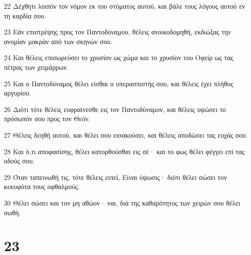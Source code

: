 \par 22 Δέχθητι λοιπόν τον νόμον εκ του στόματος αυτού, και βάλε τους λόγους αυτού εν τη καρδία σου.
\par 23 Εάν επιστρέψης προς τον Παντοδύναμου, θέλεις ανοικοδομηθή, εκδιώξας την ανομίαν μακράν από των σκηνών σου.
\par 24 Και θέλεις επισωρεύσει το χρυσίον ως χώμα και το χρυσίον του Οφείρ ως τας πέτρας των χειμάρρων.
\par 25 Και ο Παντοδύναμος θέλει είσθαι ο υπερασπιστής σου, και θέλεις έχει πλήθος αργυρίου.
\par 26 Διότι τότε θέλεις ευφραίνεσθε εις τον Παντοδύναμον, και θέλεις υψώσει το πρόσωπόν σου προς τον Θεόν.
\par 27 Θέλεις δεηθή αυτού, και θέλει σου εισακούσει, και θέλεις αποδώσει τας ευχάς σου.
\par 28 Και ό,τι αποφασίσης, θέλει κατορθούσθαι εις σέ· και το φως θέλει φέγγει επί τας οδούς σου.
\par 29 Όταν ταπεινωθή τις, τότε θέλεις ειπεί, Είναι ύψωσις· διότι θέλει σώσει τον κεκυφότα τους οφθαλμούς.
\par 30 Θέλει σώσει και τον μη αθώον· ναι, διά της καθαρότητος των χειρών σου θέλει σωθή.

\chapter{23}

